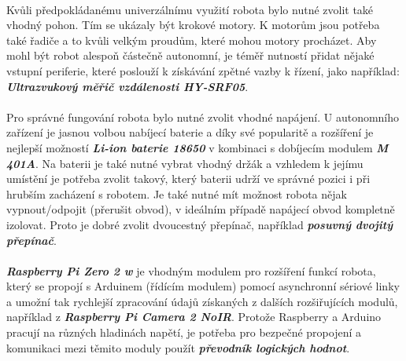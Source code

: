 \documentclass[12pt]{article}
\begin{document}
\begin{spacing}{1.5}
	\paragraph{} Kvůli předpokládanému univerzálnímu využití robota bylo nutné zvolit také vhodný pohon. Tím se ukázaly být krokové motory. K motorům jsou potřeba také řadiče a to kvůli velkým proudům, které mohou motory procházet.
	Aby mohl být robot alespoň částečně autonomní, je téměř nutností přidat nějaké vstupní periferie, které poslouží k získávání zpětné vazby k řízení, jako například: \textbf{\textit{Ultrazvukový měřič vzdálenosti HY-SRF05}}.
	
	\paragraph{} Pro správné fungování robota bylo nutné zvolit vhodné napájení. U autonomního zařízení je jasnou volbou nabíjecí baterie a díky své popularitě a rozšíření je nejlepší možností \textbf{\textit{Li-ion baterie 18650}} v kombinaci s dobíjecím modulem \textbf{\textit{M 401A}}.
	Na baterii je také nutné vybrat vhodný držák a vzhledem k jejímu umístění je potřeba zvolit takový, který baterii udrží ve správné pozici i při hrubším zacházení s robotem.
	Je také nutné mít možnost robota nějak vypnout/odpojit (přerušit obvod), v ideálním případě napájecí obvod kompletně izolovat. Proto je dobré zvolit dvoucestný přepínač, například \textit{\textbf{posuvný dvojitý přepínač}}.
	
	\paragraph{} \textbf{\textit{Raspberry Pi Zero 2 w}} je vhodným modulem pro rozšíření funkcí robota, který se propojí s Arduinem (řídícím modulem) pomocí asynchronní sériové linky a umožní tak rychlejší zpracování údajů získaných z dalších rozšiřujících modulů, například z \textbf{\textit{Raspberry Pi Camera 2 NoIR}}. Protože Raspberry a Arduino pracují na různých hladinách napětí, je potřeba pro bezpečné propojení a komunikaci mezi těmito moduly použít \textit{\textbf{převodník logických hodnot}}.
	

\end{spacing}
\end{document}
